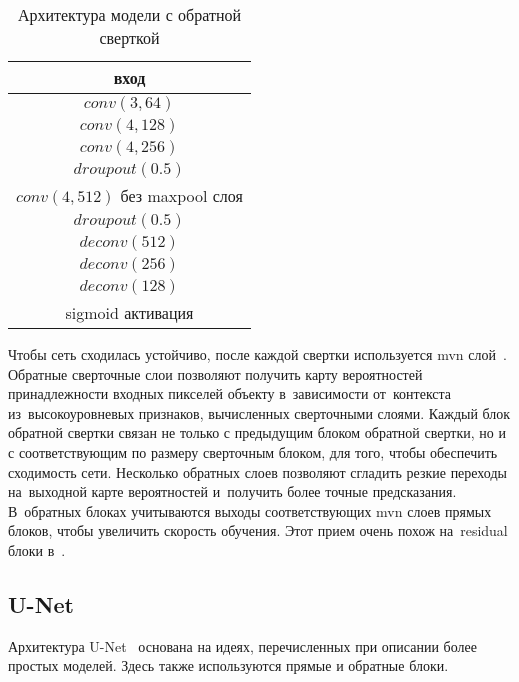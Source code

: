 \begin{table}
  \begin{center}
    \caption{Архитектура модели с обратной сверткой} \label{tab:fcn}
    \begin{tabular}{ c }
      \hline
      вход                              \\ \hline
      $conv(3,64)$                      \\ \hline
      $conv(4,128)$                     \\ \hline
      $conv(4,256)$                     \\ \hline
      $droupout(0.5)$                   \\ \hline
      $conv(4,512)$ без maxpool слоя    \\ \hline
      $droupout(0.5)$                   \\ \hline
      $deconv(512)$                     \\ \hline
      $deconv(256)$                     \\ \hline  
      $deconv(128)$                     \\ \hline      
      sigmoid активация                 \\
      \hline
    \end{tabular}
  \end{center}
\end{table}

Чтобы сеть сходилась устойчиво, после каждой свертки используется mvn слой~\cite{batch_norm}. Обратные сверточные слои позволяют получить карту вероятностей принадлежности входных пикселей объекту в~зависимости от~контекста из~высокоуровневых признаков, вычисленных сверточными слоями. Каждый блок обратной свертки связан не только с предыдущим блоком обратной свертки, но и с соответствующим по размеру сверточным блоком, для того, чтобы обеспечить сходимость сети. Несколько обратных слоев позволяют сгладить резкие переходы на~выходной карте вероятностей и~получить более точные предсказания. В~обратных блоках учитываются выходы соответствующих mvn слоев прямых блоков, чтобы увеличить скорость обучения. Этот прием очень похож на~residual блоки в~\cite{resnet}.

\subsection{U-Net}

Архитектура U-Net~\cite{unet} основана на идеях, перечисленных при описании более простых моделей. Здесь также используются прямые и обратные блоки. 

